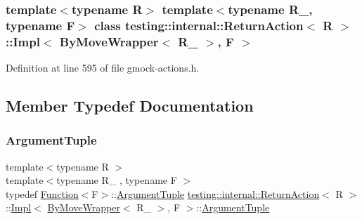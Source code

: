 \subsubsection*{template$<$typename R$>$\newline
template$<$typename R\+\_\+, typename F$>$\newline
class testing\+::internal\+::\+Return\+Action$<$ R $>$\+::\+Impl$<$ By\+Move\+Wrapper$<$ R\+\_\+ $>$, F $>$}



Definition at line 595 of file gmock-\/actions.\+h.



\subsection{Member Typedef Documentation}
\mbox{\label{classtesting_1_1internal_1_1ReturnAction_1_1Impl_3_01ByMoveWrapper_3_01R___01_4_00_01F_01_4_a5b68d6715914e165ade5864060aa4213}} 
\subsubsection{\texorpdfstring{Argument\+Tuple}{ArgumentTuple}}
{\footnotesize\ttfamily template$<$typename R $>$ \\
template$<$typename R\+\_\+ , typename F $>$ \\
typedef \hyperlink{structtesting_1_1internal_1_1Function}{Function}$<$F$>$\+::\hyperlink{classtesting_1_1ActionInterface_af72720d864da4d606629e83edc003511}{Argument\+Tuple} \hyperlink{classtesting_1_1internal_1_1ReturnAction}{testing\+::internal\+::\+Return\+Action}$<$ R $>$\+::\hyperlink{classtesting_1_1internal_1_1ReturnAction_1_1Impl}{Impl}$<$ \hyperlink{structtesting_1_1internal_1_1ByMoveWrapper}{By\+Move\+Wrapper}$<$ R\+\_\+ $>$, F $>$\+::\hyperlink{classtesting_1_1ActionInterface_af72720d864da4d606629e83edc003511}{Argument\+Tuple}}




